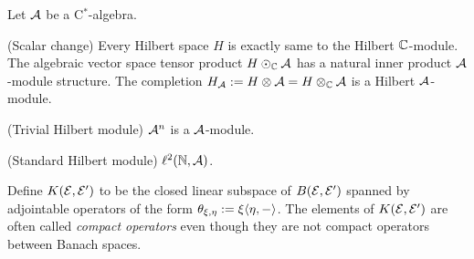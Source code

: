 \documentclass{../../../small}
\begin{document}
\begin{ex}
Let $\cA$ be a C$^*$-algebra.
\begin{parts}
\item (Scalar change) Every Hilbert space $H$ is exactly same to the Hilbert $\mathbb{C}$-module. The algebraic vector space tensor product $H\odot_{\mathbb{C}}\mathcal{A}$ has a natural inner product $\cA$-module structure. The completion $H_{\mathcal{A}}:=H\otimes\mathcal{A}=H\otimes_{\mathbb{C}}\mathcal{A}$ is a Hilbert $\cA$-module.
\item (Trivial Hilbert module) $\mathcal{A}^n$ is a $\cA$-module.
\item (Standard Hilbert module) $\ell^2(\mathbb{N},\mathcal{A})$.
\end{parts}
\end{ex}

\iffalse
\begin{ex}[Basic constructions]
product, coproducts, pullbacks, pushouts, direct limits
complementations(sub,quo), tensor products........??
localization
\begin{parts}
\item a
\item (Localization) 
Let $\cA\subset\cB$ be C$^*$-algebras and let $1_\cB\in\cA$.
Let $\f:\cB\to\cA$ be a conditional expectation.
Suppose 
Let $\cE$ be a Hilbert $\cA$-mmodule.
\end{parts}
\end{ex}
\fi


\begin{defn}
Define $K(\mathcal{E},\mathcal{E}')$ to be the closed linear subspace of $B(\mathcal{E},\mathcal{E}')$ spanned by adjointable operators of the form $\theta_{\xi,\eta}:=\xi\langle\eta,-\rangle$.
The elements of $K(\mathcal{E},\mathcal{E}')$ are often called \emph{compact operators} even though they are not compact operators between Banach spaces.
\end{defn}
\end{document}
